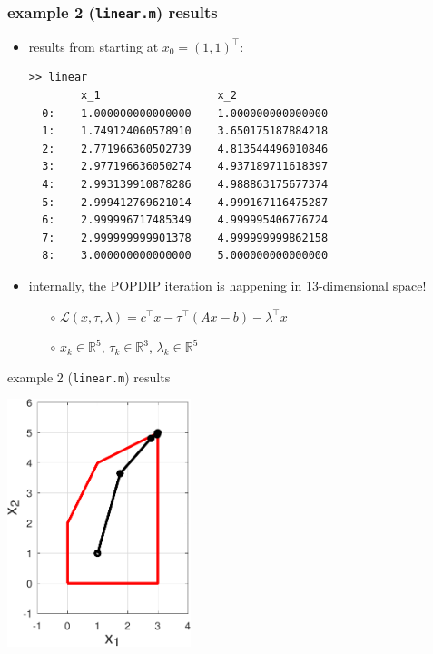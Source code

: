 \documentclass[10pt,hyperref,dvipsnames]{beamer}
\newcommand{\RR}{\mathbb{R}}
\begin{document}
\begin{frame}[fragile]
\frametitle{example 2 (\texttt{linear.m}) results}

\begin{itemize}
\item results from starting at $x_0=(1,1)^\top$:
\begin{Verbatim}[fontsize=\scriptsize]
>> linear
        x_1                  x_2
  0:    1.000000000000000    1.000000000000000
  1:    1.749124060578910    3.650175187884218
  2:    2.771966360502739    4.813544496010846
  3:    2.977196636050274    4.937189711618397
  4:    2.993139910878286    4.988863175677374
  5:    2.999412769621014    4.999167116475287
  6:    2.999996717485349    4.999995406776724
  7:    2.999999999901378    4.999999999862158
  8:    3.000000000000000    5.000000000000000
\end{Verbatim}

\bigskip
\item internally, the POPDIP iteration is happening in 13-dimensional space!
    \begin{itemize}
    \item[$\circ$] $\mathcal{L}(x,\tau,\lambda) = c^\top x - \tau^\top (Ax - b) - \lambda^\top x$
    \item[$\circ$] $x_k \in \RR^5$, \quad $\tau_k \in \RR^3$, \quad $\lambda_k \in \RR^5$
    \end{itemize}
\end{itemize}
\end{frame}


\begin{frame}{example 2 (\texttt{linear.m}) results}

\begin{center}
\includegraphics[width=0.4\textwidth]{figs/linear.pdf}
\end{center}
\end{frame}
\end{document}
